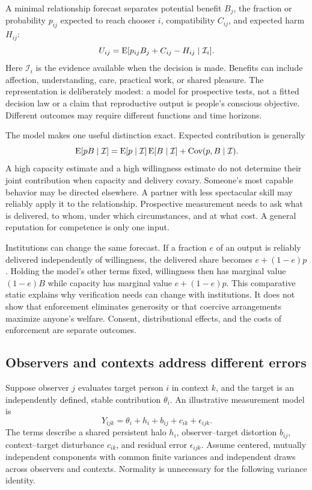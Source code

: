 A minimal relationship forecast separates potential benefit $B_j$, the fraction or probability $p_{ij}$ expected to reach chooser $i$, compatibility $C_{ij}$, and expected harm $H_{ij}$:
\begin{equation}
U_{ij}=\operatorname{E}[p_{ij}B_j+C_{ij}-H_{ij}\mid\mathcal I_i].
\label{eq:minds-utility}
\end{equation}
Here $\mathcal I_i$ is the evidence available when the decision is made. Benefits can include affection, understanding, care, practical work, or shared pleasure. The representation is deliberately modest: a model for prospective tests, not a fitted decision law or a claim that reproductive output is people's conscious objective. Different outcomes may require different functions and time horizons.

The model makes one useful distinction exact. Expected contribution is generally
\begin{equation}
\operatorname{E}[pB\mid\mathcal I]=\operatorname{E}[p\mid\mathcal I]\operatorname{E}[B\mid\mathcal I]+\operatorname{Cov}(p,B\mid\mathcal I).
\label{eq:minds-joint}
\end{equation}
A high capacity estimate and a high willingness estimate do not determine their joint contribution when capacity and delivery covary. Someone's most capable behavior may be directed elsewhere. A partner with less spectacular skill may reliably apply it to the relationship. Prospective measurement needs to ask what is delivered, to whom, under which circumstances, and at what cost. A general reputation for competence is only one input.

Institutions can change the same forecast. If a fraction $e$ of an output is reliably delivered independently of willingness, the delivered share becomes $e+(1-e)p$. Holding the model's other terms fixed, willingness then has marginal value $(1-e)B$ while capacity has marginal value $e+(1-e)p$. This comparative static explains why verification needs can change with institutions. It does not show that enforcement eliminates generosity or that coercive arrangements maximize anyone's welfare. Consent, distributional effects, and the costs of enforcement are separate outcomes.

\subsection{Observers and contexts address different errors}

Suppose observer $j$ evaluates target person $i$ in context $k$, and the target is an independently defined, stable contribution $\theta_i$. An illustrative measurement model is
\begin{equation}
Y_{ijk}=\theta_i+h_i+b_{ij}+c_{ik}+\epsilon_{ijk}.
\label{eq:minds-measurement}
\end{equation}
The terms describe a shared persistent halo $h_i$, observer--target distortion $b_{ij}$, context--target disturbance $c_{ik}$, and residual error $\epsilon_{ijk}$. Assume centered, mutually independent components with common finite variances and independent draws across observers and contexts. Normality is unnecessary for the following variance identity.

